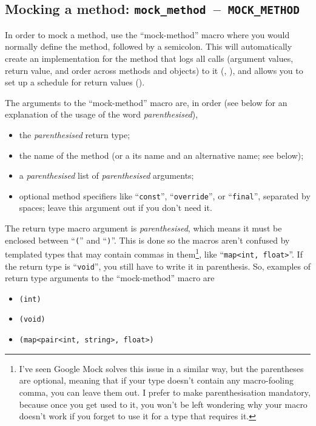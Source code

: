 \documentclass[twoside, a4paper, article]{memoir}
\newcommand*\testudocolor{\color{red!80!blue}}
\newcommand*\testudo[1]{\texttt{\testudocolor{}#1}}
\newcommand*\testudopair[2]{\testudo{#1}~--~\testudo{#2}}
\begin{document}
\subsection{Mocking a method: %
  \testudopair{mock\_method}{MOCK\_METHOD}}
\label{sec:mocking-method}

In order to mock a method, use the ``mock-method'' macro where you would
normally define the method, followed by a semicolon.  This will automatically
create an implementation for the method that logs all calls (argument values,
return value, and order across methods and objects) to it
(, ), and
allows you to set up a schedule for return values
().

The arguments to the ``mock-method'' macro are, in order (see below for an
explanation of the usage of the word \emph{parenthesised}),
\begin{itemize}
\item the \emph{parenthesised} return type;
\item the name of the method (or a its name and an alternative name; see
  below);
\item a \emph{parenthesised} list of \emph{parenthesised} arguments;
\item optional method specifiers like ``\texttt{const}'',
  ``\texttt{override}'', or ``\texttt{final}'', separated by spaces; leave this
  argument out if you don't need it.
\end{itemize}

The return type macro argument is \emph{parenthesised}, which means it must be
enclosed between ``\texttt{(}'' and ``\texttt{)}''.  This is done so the macros
aren't confused by templated types that may contain commas in
them\footnote{I've seen Google Mock solves this issue in a similar way, but the
  parentheses are optional, meaning that if your type doesn't contain any
  macro-fooling comma, you can leave them out.  I prefer to make
  parenthesisation mandatory, because once you get used to it, you won't be
  left wondering why your macro doesn't work if you forget to use it for a type
  that requires it.}, like ``\texttt{map<int, float>}''.  If the return type is
``\texttt{void}'', you still have to write it in parenthesis.  So, examples of
return type arguments to the ``mock-method'' macro are
\begin{itemize}
\item \texttt{(int)}
\item \texttt{(void)}
\item \texttt{(map<pair<int, string>, float>)}
\end{itemize}
\end{document}
